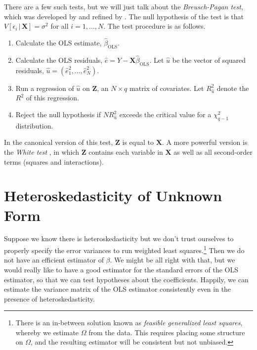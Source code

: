 \documentclass[
  12pt,
  oneside,openany]{book}
\providecommand{\tightlist}{%
  \setlength{\itemsep}{0pt}\setlength{\parskip}{0pt}}
\begin{document}
There are a few such tests, but we will just talk about the \emph{Breusch-Pagan test}, which was developed by \citet{breusch1980lagrange} and refined by \citet{koenker1982robust}. The null hypothesis of the test is that \(V[\epsilon_i \,|\, \mathbf{X}] = \sigma^2\) for all \(i = 1, \ldots, N\). The test procedure is as follows.

\begin{enumerate}
\def\labelenumi{\arabic{enumi}.}
\tightlist
\item
  Calculate the OLS estimate, \(\hat{\beta}_{\text{OLS}}\).
\item
  Calculate the OLS residuals, \(\hat{e} = Y - \mathbf{X} \hat{\beta}_{\text{OLS}}\). Let \(\hat{u}\) be the vector of squared residuals, \(\hat{u} = (\hat{e}_1^2, \ldots, \hat{e}_N^2)\).
\item
  Run a regression of \(\hat{u}\) on \(\mathbf{Z}\), an \(N \times q\) matrix of covariates. Let \(R_{\hat{u}}^2\) denote the \(R^2\) of this regression.
\item
  Reject the null hypothesis if \(N R_{\hat{u}}^2\) exceeds the critical value for a \(\chi_{q - 1}^2\) distribution.
\end{enumerate}

In the canonical version of this test, \(\mathbf{Z}\) is equal to \(\mathbf{X}\). A more powerful version is the \emph{White test} \citep{white1980heteroskedasticity}, in which \(\mathbf{Z}\) contains each variable in \(\mathbf{X}\) as well as all second-order terms (squares and interactions).

\hypertarget{heteroskedasticity-of-unknown-form}{%
\section{Heteroskedasticity of Unknown Form}\label{heteroskedasticity-of-unknown-form}}

Suppose we know there is heteroskedasticity but we don't trust ourselves to properly specify the error variances to run weighted least squares.\footnote{There is an in-between solution known as \emph{feasible generalized least squares}, whereby we estimate \(\Omega\) from the data. This requires placing some structure on \(\Omega\), and the resulting estimator will be consistent but not unbiased.} Then we do not have an efficient estimator of \(\beta\). We might be all right with that, but we would really like to have a good estimator for the standard errors of the OLS estimator, so that we can test hypotheses about the coefficients. Happily, we can estimate the variance matrix of the OLS estimator consistently even in the presence of heteroskedasticity.
\end{document}
